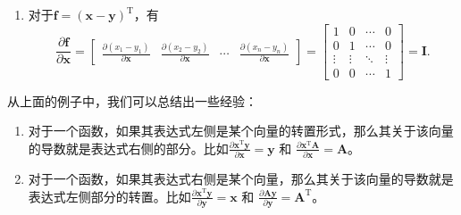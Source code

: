 \begin{solution}
\begin{enumerate}
              \[
                  \frac{\partial f}{\partial \bm{x}} =
                  \begin{bmatrix}
                      \frac{\partial f_1}{\partial \bm{x}} & \frac{\partial f_2}{\partial \bm{x}} & \cdots & \frac{\partial f_n}{\partial \bm{x}}
                  \end{bmatrix} =
                  \begin{bmatrix}
                      a_{11} & a_{12} & \cdots & a_{1n} \\
                      a_{21} & a_{22} & \cdots & a_{2n} \\
                      \vdots & \vdots & \ddots & \vdots \\
                      a_{n1} & a_{n2} & \cdots & a_{nn}
                  \end{bmatrix} = \mathbf{A}.
              \]
        \item 对于\( \bm{f} = (\bm{x} - \bm{y})^{\mathrm{T}} \)，有
              \[
                  \frac{\partial \bm{f}}{\partial \bm{x}} =
                  \begin{bmatrix}
                      \frac{\partial (x_1 - y_1)}{\partial \bm{x}} & \frac{\partial (x_2 - y_2)}{\partial \bm{x}} & \cdots & \frac{\partial (x_n - y_n)}{\partial \bm{x}}
                  \end{bmatrix} =
                  \begin{bmatrix}
                      1      & 0      & \cdots & 0      \\
                      0      & 1      & \cdots & 0      \\
                      \vdots & \vdots & \ddots & \vdots \\
                      0      & 0      & \cdots & 1
                  \end{bmatrix} = \mathbf{I}.
              \]
    \end{enumerate}
\end{solution}

从上面的例子中，我们可以总结出一些经验：

\begin{enumerate}
    \item 对于一个函数，如果其表达式左侧是某个向量的转置形式，那么其关于该向量的导数就是表达式右侧的部分。比如\( \frac{\partial \bm{x}^{\mathrm{T}} \bm{y}}{\partial \bm{x}} = \bm{y}\) 和 \( \frac{\partial \bm{x}^{\mathrm{T}} \mathbf{A}}{\partial \bm{x}} = \mathbf{A} \)。
    \item 对于一个函数，如果其表达式右侧是某个向量，那么其关于该向量的导数就是表达式左侧部分的转置。比如\( \frac{\partial \bm{x}^{\mathrm{T}} \bm{y}}{\partial \bm{y}} = \bm{x}\) 和 \( \frac{\partial \mathbf{A} \bm{y}}{\partial \bm{y}} = \mathbf{A}^{\mathrm{T}} \)。
\end{enumerate}


